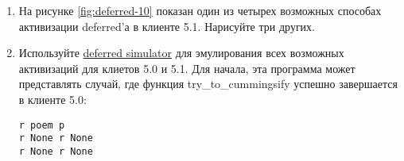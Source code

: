 \begin{enumerate}

\item На рисунке \ref{fig:deferred-10} показан один из четырех 
возможных способах активизации deferred'а в клиенте 5.1. Нарисуйте 
три других. 

\item Используйте \href{http://github.com/jdavisp3/twisted-intro/blob/master/twisted-deferred/deferred-simulator.py#L1}{deferred simulator} для эмулирования всех возможных активизаций для клиетов 5.0 и 5.1. 
Для начала, эта программа может представлять случай, где функция try\_to\_cummingsify 
успешно завершается в клиенте 5.0: 

 \begin{verbatim}
r poem p
r None r None
r None r None
\end{verbatim} 

\end{enumerate}
